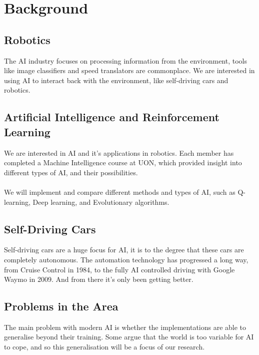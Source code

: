 \documentclass[8pt]{article}
\begin{document}
\section {Background}
\subsection{Robotics}
The AI industry focuses on processing information from the environment, tools like image classifiers and speed translators are commonplace. We are interested in using AI to interact back with the environment, like self-driving cars and robotics.

\subsection{Artificial Intelligence and Reinforcement Learning}
We are interested in AI and it's applications in robotics. Each member has completed a Machine Intelligence course at UON, which provided insight into different types of AI, and their possibilities.
\\\\
We will implement and compare different methods and types of AI, such as Q-learning, Deep learning, and Evolutionary algorithms. 

\subsection{Self-Driving Cars}
Self-driving cars are a huge focus for AI, it is to the degree that these cars are completely autonomous. The automation technology has progressed a long way, from Cruise Control\cite{CruiseControl} in 1984, to the fully AI controlled driving with Google Waymo\cite{WaymoProject} in 2009. And from there it's only been getting better.

\subsection{Problems in the Area}
The main problem with modern AI is whether the implementations are able to generalise beyond their training. Some argue that the world is too variable for AI to cope, and so this generalisation will be a focus of our research.

\newpage


%
%

%
%
%
\end{document}
